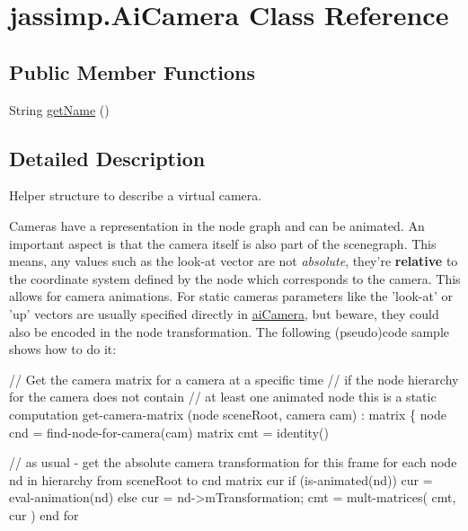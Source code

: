 \hypertarget{classjassimp_1_1_ai_camera}{\section{jassimp.\+Ai\+Camera Class Reference}
\label{classjassimp_1_1_ai_camera}
}
\subsection*{Public Member Functions}
\begin{DoxyCompactItemize}
\item 
String \hyperlink{classjassimp_1_1_ai_camera_a0d43e08905b213669d8544dafa2be408}{get\+Name} ()
\end{DoxyCompactItemize}


\subsection{Detailed Description}
Helper structure to describe a virtual camera.

Cameras have a representation in the node graph and can be animated. An important aspect is that the camera itself is also part of the scenegraph. This means, any values such as the look-\/at vector are not {\itshape absolute}, they're {\bfseries relative} to the coordinate system defined by the node which corresponds to the camera. This allows for camera animations. For static cameras parameters like the 'look-\/at' or 'up' vectors are usually specified directly in \hyperlink{structai_camera}{ai\+Camera}, but beware, they could also be encoded in the node transformation. The following (pseudo)code sample shows how to do it\+: 

{\ttfamily 
\begin{DoxyPre}
// Get the camera matrix for a camera at a specific time
// if the node hierarchy for the camera does not contain
// at least one animated node this is a static computation
get-camera-matrix (node sceneRoot, camera cam) : matrix
\{
   node   cnd = find-node-for-camera(cam)
   matrix cmt = identity()\end{DoxyPre}
}

{\ttfamily 
\begin{DoxyPre}   // as usual - get the absolute camera transformation for this frame
   for each node nd in hierarchy from sceneRoot to cnd
     matrix cur
     if (is-animated(nd))
        cur = eval-animation(nd)
     else cur = nd->mTransformation;
     cmt = mult-matrices( cmt, cur )
   end for\end{DoxyPre}
}

